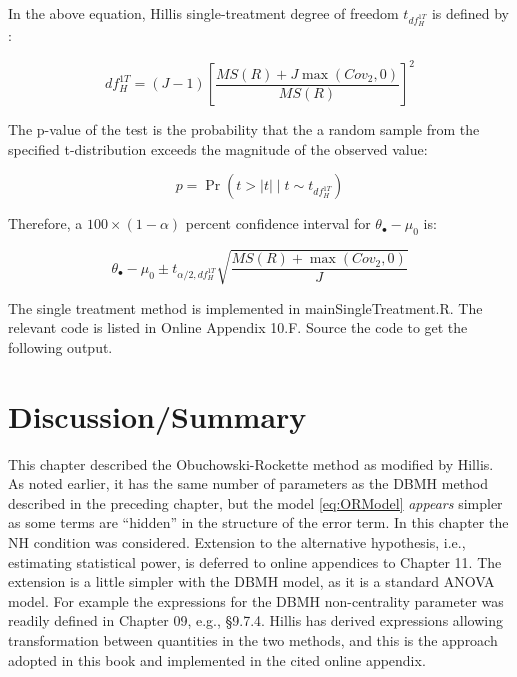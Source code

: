 \documentclass[
]{book}
\begin{document}
In the above equation, Hillis single-treatment degree of freedom \(t_{df_{H}^{1T}}\) is defined by \citep{RN2508}:

\begin{equation}
df_{H}^{1T}=(J-1)\left [\frac{MS(R)+J \max(Cov_2,0)}{MS(R)} \right ]^2
\label{eq:DefdfHI1}
\end{equation}

The p-value of the test is the probability that the a random sample from the specified t-distribution exceeds the magnitude of the observed value:

\begin{equation}
p=\Pr(t>\left | t \right |\mid t \sim t_{df_{H}^{1T}})
\label{eq:pValue1T}
\end{equation}

Therefore, a \(100 \times (1-\alpha)\) percent confidence interval for \(\theta_{\bullet}-\mu_0\) is:

\begin{equation}
\theta_{\bullet}-\mu_0 \pm t_{\alpha/2,df_{H}^{1T}} \sqrt{ \frac{MS(R)+\max(Cov_2,0)}{J}}
\label{eq:CIalpha1T}
\end{equation}

The single treatment method is implemented in mainSingleTreatment.R. The relevant code is listed in Online Appendix 10.F. Source the code to get the following output.

\hypertarget{discussionsummary}{%
\section{Discussion/Summary}\label{discussionsummary}}

This chapter described the Obuchowski-Rockette method as modified by Hillis. As noted earlier, it has the same number of parameters as the DBMH method described in the preceding chapter, but the model \eqref{eq:ORModel} \emph{appears} simpler as some terms are ``hidden'' in the structure of the error term. In this chapter the NH condition was considered. Extension to the alternative hypothesis, i.e., estimating statistical power, is deferred to online appendices to Chapter 11. The extension is a little simpler with the DBMH model, as it is a standard ANOVA model. For example the expressions for the DBMH non-centrality parameter was readily defined in Chapter 09, e.g., §9.7.4. Hillis has derived expressions allowing transformation between quantities in the two methods, and this is the approach adopted in this book and implemented in the cited online appendix.
\end{document}
